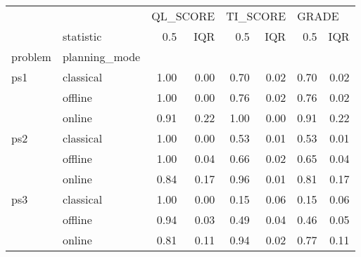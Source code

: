 \begin{tabular}{llrrrrrr}
\toprule
    & {} & \multicolumn{2}{l}{QL\_SCORE} & \multicolumn{2}{l}{TI\_SCORE} & \multicolumn{2}{l}{GRADE} \\
    & statistic &      0.5 &  IQR &      0.5 &  IQR &   0.5 &  IQR \\
problem & planning\_mode &          &      &          &      &       &      \\
\midrule
ps1 & classical &     1.00 & 0.00 &     0.70 & 0.02 &  0.70 & 0.02 \\
    & offline &     1.00 & 0.00 &     0.76 & 0.02 &  0.76 & 0.02 \\
    & online &     0.91 & 0.22 &     1.00 & 0.00 &  0.91 & 0.22 \\
ps2 & classical &     1.00 & 0.00 &     0.53 & 0.01 &  0.53 & 0.01 \\
    & offline &     1.00 & 0.04 &     0.66 & 0.02 &  0.65 & 0.04 \\
    & online &     0.84 & 0.17 &     0.96 & 0.01 &  0.81 & 0.17 \\
ps3 & classical &     1.00 & 0.00 &     0.15 & 0.06 &  0.15 & 0.06 \\
    & offline &     0.94 & 0.03 &     0.49 & 0.04 &  0.46 & 0.05 \\
    & online &     0.81 & 0.11 &     0.94 & 0.02 &  0.77 & 0.11 \\
\bottomrule
\end{tabular}
